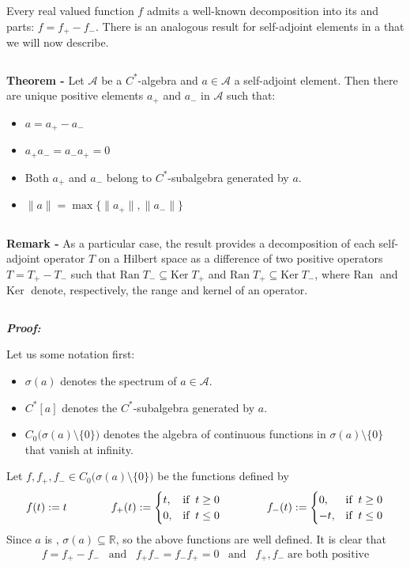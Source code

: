 \documentclass[12pt]{article}
\begin{document}

Every real valued function $f$ admits a well-known decomposition into its  and  parts: $f = f_+ - f_-$. There is an analogous result for self-adjoint elements in a  that we will now describe.

$\,$

{\bf Theorem - } Let $\mathcal{A}$ be a $C^*$-algebra and $a \in \mathcal{A}$ a self-adjoint element. Then there are unique positive elements $a_+$ and $a_-$ in $\mathcal{A}$ such that:
\begin{itemize}
\item $a= a_+ - a_-$
\item $a_+a_- = a_-a_+ = 0$
\item Both $a_+$ and $a_-$ belong to $C^*$-subalgebra generated by $a$.
\item $\|a\| = \max\{\|a_+\|, \|a_-\|\}$
\end{itemize}

$\,$

{\bf Remark - } As a particular case, the result provides a decomposition of each self-adjoint operator $T$ on a Hilbert space as a difference of two positive operators $T=T_+ - T_-$ such that $\mathrm{Ran}\; T_- \subseteq \mathrm{Ker}\; T_+$ and $\mathrm{Ran}\; T_+ \subseteq \mathrm{Ker}\; T_-$, where $\mathrm{Ran}\;$ and $\mathrm{Ker}\;$ denote, respectively, the range and kernel of an operator.

$\,$

{\bf \emph{Proof:}}

Let us  some notation first:
\begin{itemize}
\item $\sigma(a)$ denotes the spectrum of $a \in \mathcal{A}$.
\item $C^*[a]$ denotes the $C^*$-subalgebra generated by $a$.
\item $C_0 \big(\sigma(a)\setminus \{0\}\big)$ denotes the algebra of continuous functions in $\sigma(a)\setminus \{0\}$ that vanish at infinity.
\end{itemize}

Let $f, f_+, f_- \in C_0\big(\sigma(a)\setminus \{0\}\big)$ be the functions defined by
\begin{align*}
f(t):=t \qquad\qquad
f_+(t) :=
\begin{cases}
t, & $if$\;\; t \geq 0\\
0, & $if$\;\; t \leq 0
\end{cases}
\qquad\qquad f_-(t):=
\begin{cases}
0, & $if$\;\; t \geq 0\\
-t, & $if$\;\; t \leq 0
\end{cases}
\end{align*}
Since $a$ is , $\sigma(a) \subseteq \mathbb{R}$, so the above functions are well defined. It is clear that
\begin{align}
f = f_+ - f_- \;\;\;\text{and}\;\;\; f_+f_-=f_-f_+=0 \;\;\;\text{and}\;\;\; f_+, f_- \;\text{are both positive}
\end{align}
\end{document}
